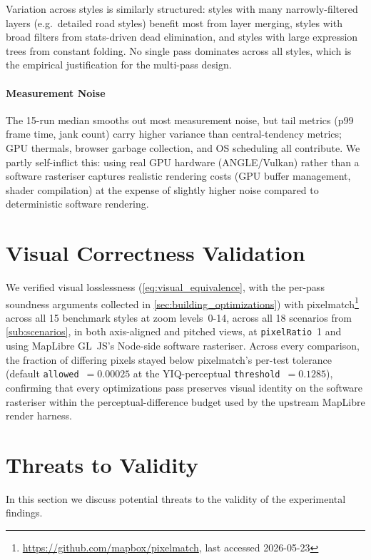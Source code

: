 Variation across styles is similarly structured:
styles with many narrowly-filtered layers (e.g.\ detailed road styles) benefit most from layer merging, styles with broad filters from stats-driven dead elimination, and styles with large expression trees from constant folding.
No single pass dominates across all styles, which is the empirical justification for the multi-pass design.

\paragraph{Measurement Noise}
The 15-run median smooths out most measurement noise, but tail metrics (p99 frame time, jank count) carry higher variance than central-tendency metrics; \ac{GPU} thermals, browser garbage collection, and OS scheduling all contribute.
We partly self-inflict this: using real \ac{GPU} hardware (ANGLE/Vulkan) rather than a software rasteriser captures realistic rendering costs (\ac{GPU} buffer management, shader compilation) at the expense of slightly higher noise compared to deterministic software rendering.


\section{Visual Correctness Validation}\label{sec:visual_correctness}

We verified visual losslessness (\cref{eq:visual_equivalence}, with the per-pass soundness arguments collected in \cref{sec:building_optimizations}) with pixelmatch\footnote{\url{https://github.com/mapbox/pixelmatch}, last accessed 2026-05-23} across all 15 benchmark styles at zoom levels~0-14, across all 18 scenarios from \cref{sub:scenarios}, in both axis-aligned and pitched views, at \texttt{pixelRatio}~1 and using MapLibre GL~JS's Node-side software rasteriser.
Across every comparison, the fraction of differing pixels stayed below pixelmatch's per-test tolerance (default \texttt{allowed}~$=0.00025$ at the YIQ-perceptual \texttt{threshold}~$=0.1285$), confirming that every optimizations pass preserves visual identity on the software rasteriser within the perceptual-difference budget used by the upstream MapLibre render harness.

\section{Threats to Validity}\label{sec:threats}

In this section we discuss potential threats to the validity of the experimental findings.

